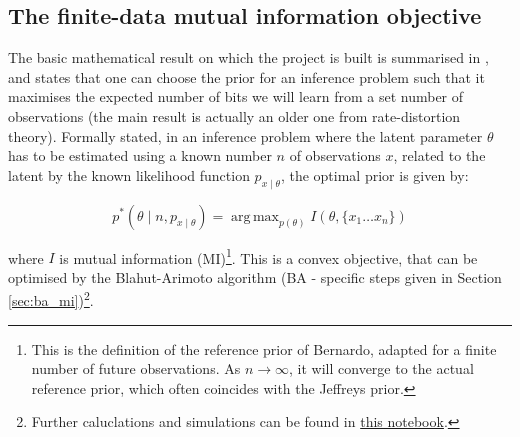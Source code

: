 \documentclass{article}
\DeclareMathOperator*{\argmax}{arg\,max}
\begin{document}
\subsection{The finite-data mutual information objective}
The basic mathematical result on which the project is built is summarised in \cite{mattingly2018}, and states that one can choose the prior for an inference problem such that it maximises the expected number of bits we will learn from a set number of observations (the main result is actually an older one from rate-distortion theory\cite{rose2002mapping}). Formally stated, in an inference problem where the latent parameter $\theta$ has to be estimated using a known number $n$ of observations $x$, related to the latent by the known likelihood function $p_{x \mid \theta}$, the optimal prior is given by: 

\begin{equation}
    p^*(\theta \mid n, p_{x \mid \theta}) = \argmax_{p(\theta)} I(\theta, \lbrace x_1 \ldots x_n \rbrace)
\end{equation}

where $I$ is mutual information (MI)\footnote{This is the definition of the reference prior of Bernardo, adapted for a finite number of future observations. As $n \rightarrow \infty$, it will converge to the actual reference prior, which often coincides with the Jeffreys prior.}. This is a convex objective, that can be optimised by the Blahut-Arimoto algorithm (BA - specific steps given in Section \ref{sec:ba_mi})\footnote{Further caluclations and simulations can be found in \href{https://github.com/mihalybanyai/infomax/blob/main/sequential_infomax.ipynb}{this notebook}. }. 
\end{document}
